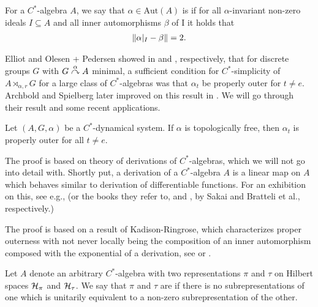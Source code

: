 \begin{definition}
	For a $C^*$-algebra $A$, we say that $\alpha \in \mathrm{Aut}(A)$ is  if for all $\alpha$-invariant non-zero ideals $I \subseteq A$ and all inner automorphisms $\beta$ of I it holds that
	\begin{align*}
		\left\lVert \alpha|_I - \beta \right\rVert = 2.
	\end{align*}
\end{definition}
Elliot and Olesen + Pedersen showed in \cite[Theorem 3.2]{elliott1980some} and \cite[Theorem 7.2]{olesenpedersen3}, respectively, that for discrete groups $G$ with $G \stackrel{\alpha}{\curvearrowright} A$ minimal, a sufficient condition for $C^*$-simplicity of $A \rtimes_{\alpha,r} G$ for a large class of $C^*$-algebras was that $\alpha_t$ be properly outer for $t \neq e$. Archbold and Spielberg later improved on this result in \cite{archbold1994topologically}. We will go through their result and some recent applications.
\begin{proposition}
	Let $(A,G,\alpha)$ be a $C^*$-dynamical system. If $\alpha$ is topologically free, then $\alpha_t$ is properly outer for all $t \neq e$.
\end{proposition}
\begin{remark}
	The proof is based on theory of derivations of $C^*$-algebras, which we will not go into detail with. Shortly put, a derivation of a $C^*$-algebra $A$ is a linear map on $A$ which behaves similar to derivation of differentiable functions. For an exhibition on this, see e.g., \cite[Chapter 8.6]{pedersenalgauto} (or the books they refer to, \cite{sakai1978recent} and \cite{bratteli2012operator}, by Sakai and Bratteli et al., respectively.) 

	The proof is based on a result of Kadison-Ringrose, which characterizes proper outerness with not never locally being the composition of an inner automorphism composed with the exponential of a derivation, see \cite{kadison1967derivations} or \cite[Theorem 6.6 (i) and (ii)]{olesenpedersen3}.
\end{remark}
\begin{definition}
	Let $A$ denote an arbitrary $C^*$-algebra with two representations $\pi$ and $\tau$ on Hilbert spaces $\mathcal{H}_\pi$ and $\mathcal{H}_\tau$. We say that $\pi$ and $\tau$ are  if there is no subrepresentations of one which is unitarily equivalent to a non-zero subrepresentation of the other.
\end{definition}
